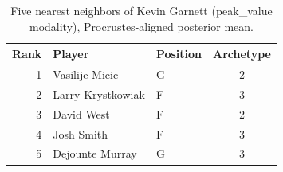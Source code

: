 \begin{table}[htbp]
  \centering\small
  \begin{tabular}{rllc}
    \toprule
    Rank & Player & Position & Archetype \\
    \midrule
    1 & Vasilije Micic & G & 2 \\
    2 & Larry Krystkowiak & F & 3 \\
    3 & David West & F & 2 \\
    4 & Josh Smith & F & 3 \\
    5 & Dejounte Murray & G & 3 \\
    \bottomrule
  \end{tabular}
  \caption{Five nearest neighbors of Kevin Garnett (peak_value modality), Procrustes-aligned posterior mean.}
  \label{tab:Kevin_Garnett_neighbors_peak_value}
\end{table}

